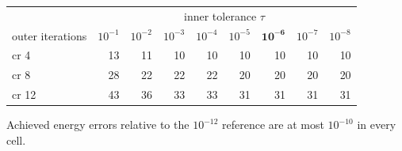 {\small
\begin{tabular}{lrrrrrrrr}
\toprule
& \multicolumn{8}{c}{inner tolerance $\tau$} \\
outer iterations & $10^{-1}$ & $10^{-2}$ & $10^{-3}$ & $10^{-4}$ & $10^{-5}$ & $\mathbf{10^{-6}}$ & $10^{-7}$ & $10^{-8}$ \\
\midrule
cr 4 & 13 & 11 & 10 & 10 & 10 & 10 & 10 & 10 \\
cr 8 & 28 & 22 & 22 & 22 & 20 & 20 & 20 & 20 \\
cr 12 & 43 & 36 & 33 & 33 & 31 & 31 & 31 & 31 \\
\bottomrule
\end{tabular}
\par\smallskip
{\footnotesize Achieved energy errors relative to the $10^{-12}$ reference are at most $10^{-10}$ in every cell.}
}
